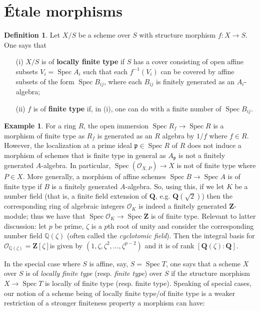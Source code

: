\documentclass[oneside]{amsart}
\theoremstyle{definition}
\newtheorem{defi}{Definition}[section]
\DeclareMathOperator{\spec}{Spec}
\newtheorem{ex}{Example}[section]
\newcommand{\zz}{\mathbf Z}
\newcommand{\qq}{\mathbf Q}
\begin{document}
\section{\'Etale morphisms} 
\begin{defi}
 Let $X/S$ be a scheme over $S$ with structure morphism $f \colon X \to S$. One says that  
 \begin{itemize}
 	\item[(i)] $X/S$ is of \textbf{locally finite type} if $S$ has a cover consisting of open affine subsets $V_i = \spec A_i$ such that each $f ^{-1} (V_i)$ can be covered by affine subsets of the form $\spec B _{ij}$, where each $B _{ij}$ is finitely generated as an $A_i$-algebra;   
 	\item[(ii)]  $f$ is of \textbf{finite type} if, in (i), one can do with a finite number of $\spec B _{ij}$. 
\end{itemize}
\begin{ex} For a ring $R$, the open immersion $\spec R_f \to \spec R$ is a morphism of finite type as $R_f$ is generated as an $R$ algebra by $1/f$ where $f \in R$. However, the localization at a prime ideal $\mathfrak p \in \spec R$ of $R$ does not induce a morphism of schemes that is finite type in general as $A_\mathfrak p$ is not a finitely generated $A$-algebra. In particular, $\spec (\mathscr O _{X,P}) \to X$ is not of finite type where $P \in X$. More generally, a morphism of affine schemes $\spec B \to \spec A$ is of finite type if $B$ is a finitely generated $A$-algebra. So, using this, if we let $K$ be a number field (that is, a finite field extension of $\qq $, e.g. $\qq (\sqrt{2})$) then the corresponding ring of algebraic integers $\mathcal O_K$ is indeed a finitely generated $\zz$-module; thus we have that $\spec \mathcal O_K \to \spec \zz$ is of finite type. Relevant to latter discussion: let $p$ be prime, $\zeta$ is a $p$th root of unity and consider the corresponding number field $\mathbb Q (\zeta)$ (often called the \textit{cyclotomic field}). Then the integral basis for $\mathcal O_{\mathbb Q (\zeta)} = \zz [\zeta]$is given by $(1, \zeta, \zeta^2, \ldots, \zeta^{p-2})$ and it is of rank $[\qq (\zeta) : \qq ]$.
\end{ex}

 
\end{defi}
In the special case where $S$ is affine, say, $S = \spec T$, one says that a scheme $X$ over $S$ is of \textit{locally finite type} (resp. \textit{finite type}) over $S$ if the structure morphism $X \to \spec T$ is locally of finite type (resp. finite type). Speaking of special cases, our notion of a scheme being of locally finite type/of finite type is a weaker restriction of a stronger finiteness property a morphism can have:
\end{document}
